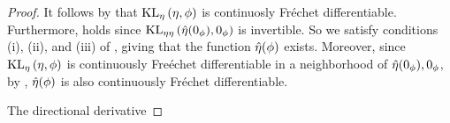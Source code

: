\begin{thm}
\begin{proof}
It follows by \citet[Proposition 4.14(c)]{zeidler:2013:functional} that
$\mathrm{KL}_{\eta}\left(\eta, \phi\right)$ is continuosly Fr{\'e}chet differentiable.  Furthermore,
\citet[Chapter 4 Condition 21b]{zeidler:2013:functional} holds since
$\mathrm{KL}_{\eta\eta}\left(\hat\eta(0_\phi), 0_\phi\right)$ is invertible.  So we satisfy conditions (i),
(ii), and (iii) of \citet[Theorem 4.B(c)]{zeidler:2013:functional}, giving that
the function $\hat\eta(\phi)$ exists.  Moreover, since $\mathrm{KL}_{\eta}\left(\eta, \phi\right)$ is
continuously Fre{\'e}chet differentiable in a neighborhood of $\hat\eta(0_\phi),
0_\phi$, by \citet[Theorem 4.B(d)]{zeidler:2013:functional}, $\hat\eta(\phi)$ is
also continuously Fr{\'e}chet differentiable.

The directional derivative

%
\end{proof}
%
\end{thm}
%
